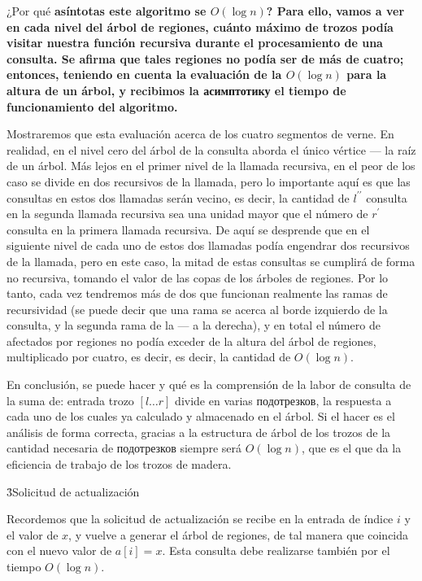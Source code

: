 ¿Por qué \bf{asíntotas} este algoritmo se $O (\log n)$? Para ello, vamos a ver en cada nivel del árbol de regiones, cuánto máximo de trozos podía visitar nuestra función recursiva durante el procesamiento de una consulta. Se afirma que tales regiones no podía ser de más de cuatro; entonces, teniendo en cuenta la evaluación de la $O (\log n)$ para la altura de un árbol, y recibimos la асимптотику el tiempo de funcionamiento del algoritmo.

Mostraremos que esta evaluación acerca de los cuatro segmentos de verne. En realidad, en el nivel cero del árbol de la consulta aborda el único vértice --- la raíz de un árbol. Más lejos en el primer nivel de la llamada recursiva, en el peor de los caso se divide en dos recursivos de la llamada, pero lo importante aquí es que las consultas en estos dos llamadas serán vecino, es decir, la cantidad de $l^{\prime\prime}$ consulta en la segunda llamada recursiva sea una unidad mayor que el número de $r^\prime$ consulta en la primera llamada recursiva. De aquí se desprende que en el siguiente nivel de cada uno de estos dos llamadas podía engendrar dos recursivos de la llamada, pero en este caso, la mitad de estas consultas se cumplirá de forma no recursiva, tomando el valor de las copas de los árboles de regiones. Por lo tanto, cada vez tendremos más de dos que funcionan realmente las ramas de recursividad (se puede decir que una rama se acerca al borde izquierdo de la consulta, y la segunda rama de la --- a la derecha), y en total el número de afectados por regiones no podía exceder de la altura del árbol de regiones, multiplicado por cuatro, es decir, es decir, la cantidad de $O (\log n)$.

En conclusión, se puede hacer y qué es la comprensión de la labor de consulta de la suma de: entrada trozo $[l \ldots r]$ divide en varias подотрезков, la respuesta a cada uno de los cuales ya calculado y almacenado en el árbol. Si el hacer es el análisis de forma correcta, gracias a la estructura de árbol de los trozos de la cantidad necesaria de подотрезков siempre será $O (\log n)$, que es el que da la eficiencia de trabajo de los trozos de madera.


\h3{Solicitud de actualización}

Recordemos que la solicitud de actualización se recibe en la entrada de índice $i$ y el valor de $x$, y vuelve a generar el árbol de regiones, de tal manera que coincida con el nuevo valor de $a[i]=x$. Esta consulta debe realizarse también por el tiempo $O (\log n)$.

